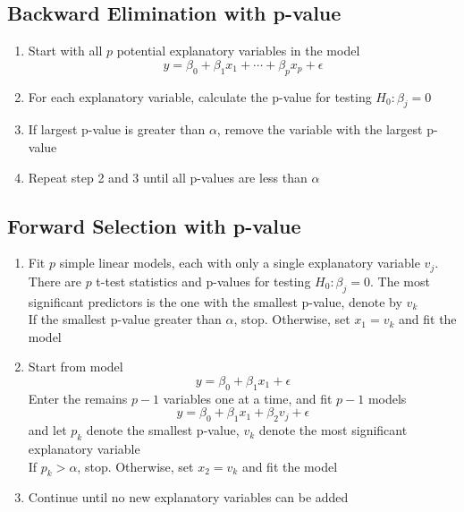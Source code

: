 \documentclass[11pt]{article}
\begin{document}
\subsection{Backward Elimination with p-value}
\begin{enumerate}
    \item Start with all $p$ potential explanatory variables in the model \[y=\beta_0+\beta_1x_1+\cdots+\beta_px_p+\epsilon\]
    \item For each explanatory variable, calculate the p-value for testing $H_0:\beta_j=0$
    \item If largest p-value is greater than $\alpha$, remove the variable with the largest p-value
    \item Repeat step 2 and 3 until all p-values are less than $\alpha$
\end{enumerate}
\subsection{Forward Selection with p-value}
\begin{enumerate}
    \item Fit $p$ simple linear models, each with only a single explanatory variable $v_j$. There are 
    $p$ t-test statistics and p-values for testing $H_0:\beta_j=0$. The most significant predictors is the one 
    with the smallest p-value, denote by $v_k$ \\
    If the smallest p-value greater than $\alpha$, stop. Otherwise, set $x_1=v_k$ and fit the model 
    \item Start from model \[y=\beta_0+\beta_1x_1+\epsilon\]
    Enter the remains $p-1$ variables one at a time, and fit $p-1$ models
    \[y=\beta_0+\beta_1x_1+\beta_2v_j+\epsilon\]
    and let $p_k$ denote the smallest p-value, $v_k$ denote the most significant explanatory variable \\
    If $p_k>\alpha$, stop. Otherwise, set $x_2=v_k$ and fit the model
    \item Continue until no new explanatory variables can be added 
\end{enumerate}
\end{document}
